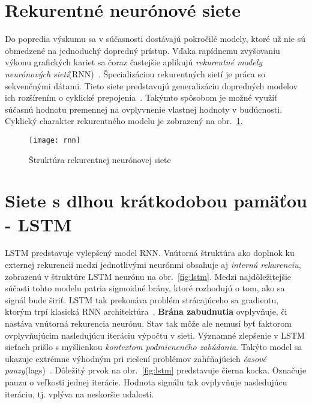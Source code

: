 \section{Rekurentné neurónové siete}
\label{analyza_pokrocile_modely_nn}

Do popredia výskumu sa v súčasnosti dostávajú pokročilé modely, ktoré už nie sú obmedzené na jednoduchý dopredný prístup. Vďaka rapídnemu zvyšovaniu výkonu grafických kariet sa čoraz častejšie aplikujú \textit{rekurentné modely neurónových sietí}(RNN)~\cite{jaeger2002tutorial}. Špecializáciou rekurentných sietí je práca so sekvenčnými dátami. Tieto siete predstavujú generalizáciu dopredných modelov ich rozšírením o cyklické prepojenia~\cite{Goodfellow-et-al-2016-Book}.
Takýmto spôsobom je možné využiť súčasnú hodnotu premennej na ovplyvnenie vlastnej hodnoty v budúcnosti. Cyklický charakter rekurentného modelu je zobrazený na obr.~\ref{fig:rnn}.

\begin{figure}[H]
\begin{center}\texttt{[image: rnn]}\end{center}
\caption[rnn]{Štruktúra rekurentnej neurónovej siete~\cite{jaeger2002tutorial}}\label{fig:rnn}
\end{figure}

\section{Siete s dlhou krátkodobou pamäťou - LSTM}


LSTM predstavuje vylepšený model RNN. Vnútorná štruktúra ako doplnok ku externej rekurencii medzi jednotlivými neurónmi obsahuje aj \textit{internú rekurenciu}, zobrazenú v štruktúre LSTM neurónu na obr.~\ref{fig:lstm}. Medzi najdôležitejšie súčasti tohto modelu patria sigmoidné brány, ktoré rozhodujú o tom, ako sa signál bude širiť. LSTM tak prekonáva problém strácajúceho sa gradientu, ktorým trpí klasická RNN architektúra~\cite{hochreiter1997long}.
\newline
\textbf{Brána zabudnutia} ovplyvňuje, či nastáva vnútorná rekurencia neurónu. Stav tak môže ale nemusí byť faktorom ovplyvňujúcim nasledujúcu iteráciu výpočtu v sieti. Významné zlepšenie v LSTM sieťach prišlo s myšlienkou \textit{kontextom podmieneného zabúdania}. Takýto model sa ukazuje extrémne výhodným pri riešení problémov zahŕňajúcich \textit{časové pauzy}(lags)~\cite{gers2000learning}.
 Dôležitý prvok  na obr.~\ref{fig:lstm} predstavuje čierna kocka. Označuje pauzu o veľkosti jednej iterácie. Hodnota signálu tak ovplyvňuje nasledujúcu iteráciu, tj. vplýva na neskoršie udalosti.
\newline
\noindent


